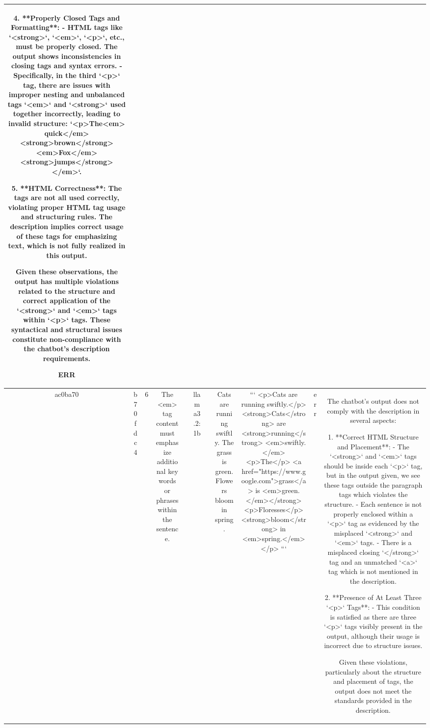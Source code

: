 \begin{table}[h!]
\begin{tabular}{|c|c|c|c|c|c|c|c|c|c|c|}
4. **Properly Closed Tags and Formatting**:
   - HTML tags like `<strong>`, `<em>`, `<p>`, etc., must be properly closed. The output shows inconsistencies in closing tags and syntax errors.
   - Specifically, in the third `<p>` tag, there are issues with improper nesting and unbalanced tags `<em>` and `<strong>` used together incorrectly, leading to invalid structure: `<p>The<em> quick</em><strong>brown</strong><em>Fox</em><strong>jumps</strong></em>`.

5. **HTML Correctness**: The tags are not all used correctly, violating proper HTML tag usage and structuring rules. The description implies correct usage of these tags for emphasizing text, which is not fully realized in this output.

Given these observations, the output has multiple violations related to the structure and correct application of the `<strong>` and `<em>` tags within `<p>` tags. These syntactical and structural issues constitute non-compliance with the chatbot's description requirements.

ERR\\
\hline
ac0ba70 & b70fdc4 & 6 & The <em> tag content must emphasize additional key words or phrases within the sentence. &  & llama3.2:1b &  & Cats are running swiftly. The grass is green. Flowers bloom in spring. & ```
<p>Cats are running swiftly.</p>
<strong>Cats</strong> are <strong>running</strong> <em>swiftly.</em>
<p>The</p>
<a href="https://www.google.com">grass</a> is <em>green.</em></strong>
<p>Floresses</p>
<strong>bloom</strong> in <em>spring.</em></p>
``` & err & The chatbot's output does not comply with the description in several aspects:

1. **Correct HTML Structure and Placement**: 
   - The `<strong>` and `<em>` tags should be inside each `<p>` tag, but in the output given, we see these tags outside the paragraph tags which violates the structure.
   - Each sentence is not properly enclosed within a `<p>` tag as evidenced by the misplaced `<strong>` and `<em>` tags.
   - There is a misplaced closing `</strong>` tag and an unmatched `<a>` tag which is not mentioned in the description.

2. **Presence of At Least Three `<p>` Tags**: 
   - This condition is satisfied as there are three `<p>` tags visibly present in the output, although their usage is incorrect due to structure issues.

Given these violations, particularly about the structure and placement of tags, the output does not meet the standards provided in the description.


\end{tabular}
\end{table}
